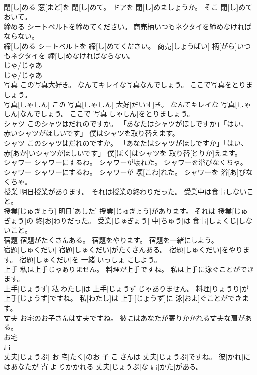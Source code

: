 \documentclass[8pt]{extreport}
\begin{document}
\begin{CJK}{UTF8}{min}
\\	閉[し]める 窓[まど]を 閉[し]めて。 ドアを 閉[し]めましょうか。 そこ 閉[し]めておいて。
\\	締める シートベルトを締めてください。 商売柄いつもネクタイを締めなければならない。	
\\	締[し]める シートベルトを 締[し]めてください。 商売[しょうばい] 柄[がら]いつもネクタイを 締[し]めなければならない。
\\	じゃ/じゃあ	
\\	じゃ/じゃあ
\\	写真 この写真大好き。 なんてキレイな写真なんでしょう。 ここで写真をとりましょう。	
\\	写真[しゃしん] この 写真[しゃしん] 大好[だいす]き。 なんてキレイな 写真[しゃしん]なんでしょう。 ここで 写真[しゃしん]をとりましょう。
\\	シャツ このシャツはだれのですか。 「あなたはシャツがほしですか」「はい、赤いシャツがほしいです」 僕はシャツを取り替えます。	
\\	シャツ このシャツはだれのですか。 「あなたはシャツがほしですか」「はい、 赤[あか]いシャツがほしいです」 僕[ぼく]はシャツを 取り替[とりか]えます。
\\	シャワー シャワーにするわ。 シャワーが壊れた。 シャワーを浴びなくちゃ。	
\\	シャワー シャワーにするわ。 シャワーが 壊[こわ]れた。 シャワーを 浴[あ]びなくちゃ。
\\	授業 明日授業があります。 それは授業の終わりだった。 受業中は食事しないこと。	
\\	授業[じゅぎょう] 明日[あした] 授業[じゅぎょう]があります。 それは 授業[じゅぎょう]の 終[お]わりだった。 受業[じゅぎょう] 中[ちゅう]は 食事[しょくじ]しないこと。
\\	宿題 宿題がたくさんある。 宿題をやります。 宿題を一緒にしよう。	
\\	宿題[しゅくだい] 宿題[しゅくだい]がたくさんある。 宿題[しゅくだい]をやります。 宿題[しゅくだい]を 一緒[いっしょ]にしよう。
\\	上手 私は上手じゃありません。 料理が上手ですね。 私は上手に泳ぐことができます。	
\\	上手[じょうず] 私[わたし]は 上手[じょうず]じゃありません。 料理[りょうり]が 上手[じょうず]ですね。 私[わたし]は 上手[じょうず]に 泳[およ]ぐことができます。
\\	丈夫 お宅のお子さんは丈夫ですね。 彼にはあなたが寄りかかれる丈夫な肩がある。	
\\	お宅 
\\	肩
\\	丈夫[じょうぶ] お 宅[たく]のお 子[こ]さんは 丈夫[じょうぶ]ですね。 彼[かれ]にはあなたが 寄[よ]りかかれる 丈夫[じょうぶ]な 肩[かた]がある。

\end{CJK}
\end{document}
